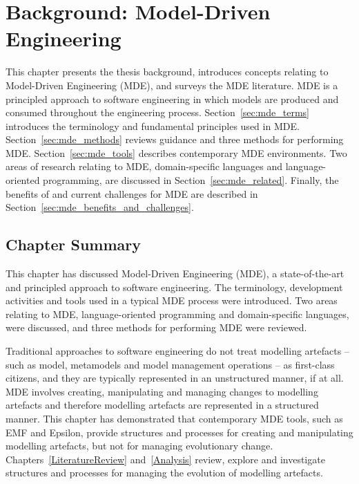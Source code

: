 
\chapter{Background: Model-Driven Engineering}
\label{Background}
This chapter presents the thesis background, introduces concepts relating to Model-Driven Engineering (MDE), and surveys the MDE literature. MDE is a principled approach to software engineering in which models are produced and consumed throughout the engineering process. Section~\ref{sec:mde_terms} introduces the terminology and fundamental principles used in MDE. Section~\ref{sec:mde_methods} reviews guidance and three methods for performing MDE. Section~\ref{sec:mde_tools} describes contemporary MDE environments. Two areas of research relating to MDE, domain-specific languages and language-oriented programming, are discussed in Section~\ref{sec:mde_related}. Finally, the benefits of and current challenges for MDE are described in Section~\ref{sec:mde_benefits_and_challenges}.







\section{Chapter Summary}
This chapter has discussed Model-Driven Engineering (MDE), a state-of-the-art and principled approach to software engineering. The terminology, development activities and tools used in a typical MDE process were introduced. Two areas relating to MDE, language-oriented programming and domain-specific languages, were discussed, and three methods for performing MDE were reviewed.

Traditional approaches to software engineering do not treat modelling artefacts -- such as model, metamodels and model management operations -- as first-class citizens, and they are typically represented in an unstructured manner, if at all. MDE involves creating, manipulating and managing changes to modelling artefacts and therefore modelling artefacts are represented in a structured manner. This chapter has demonstrated that contemporary MDE tools, such as EMF and Epsilon, provide structures and processes for creating and manipulating modelling artefacts, but not for managing evolutionary change. Chapters~\ref{LiteratureReview} and~\ref{Analysis} review, explore and investigate structures and processes for managing the evolution of modelling artefacts.